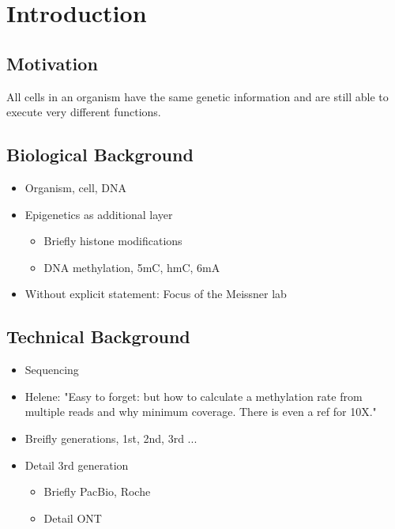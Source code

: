 \chapter{Introduction}
\label{cha:intro}



\section{Motivation}
\label{sec:intro:motivation}

All cells in an organism have the same genetic information and are still able to execute very different functions.

\section{Biological Background}
\label{sec:intro:bio}

\begin{itemize}
    \item Organism, cell, DNA
    \item Epigenetics as additional layer
    \begin{itemize}
        \item Briefly histone modifications
        \item DNA methylation, 5mC, hmC, 6mA
    \end{itemize}
    \item Without explicit statement: Focus of the Meissner lab
\end{itemize}


\section{Technical Background}
\label{sec:intro:sequencing}

\begin{itemize}
    \item Sequencing
    \item Helene: "Easy to forget: but how to calculate a methylation rate from multiple reads and why minimum coverage. There is even a ref for 10X."
    \item Breifly generations, 1st, 2nd, 3rd ...
    \item Detail 3rd generation
    \begin{itemize}
        \item Briefly PacBio, Roche
        \item Detail ONT
    \end{itemize}
\end{itemize}

